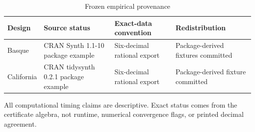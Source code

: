 \documentclass[10pt]{article}
\theoremstyle{definition}
\begin{document}
\begin{table}[ht]
\centering
\caption{Frozen empirical provenance}\label{tab:provenance}
\small
\begin{tabular}{@{}>{\raggedright\arraybackslash}p{}
                    >{\raggedright\arraybackslash}p{}
                    >{\raggedright\arraybackslash}p{}
                    >{\raggedright\arraybackslash}p{}@{}}
\toprule
Design & Source status & Exact-data convention & Redistribution \\
\midrule
Basque & CRAN \textsf{Synth} 1.1-10 package example & Six-decimal rational export & Package-derived fixtures committed \\
California & CRAN \textsf{tidysynth} 0.2.1 package example & Six-decimal rational export & Package-derived fixture committed \\
\bottomrule
\end{tabular}
\end{table}

All computational timing claims are descriptive.  Exact status comes from the
certificate algebra, not runtime, numerical convergence flags, or printed
decimal agreement.



\end{document}
